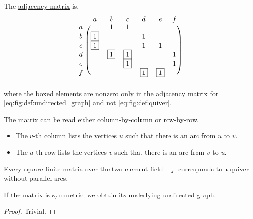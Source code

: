 \begin{example}
  The \hyperref[def:graph_adjacency_matrix]{adjacency matrix} is,
  \begin{equation}\label{ex:quiver_matrices/adjacency}
    \begin{blockarray}{cccccccc}
        & a        & b        & c        & d        & e        & f \\
    \begin{block}{c(ccccccc)}
      a &          & 1        & 1        &          &          &   \\
      b & \fbox{1} &          &          & 1        &          &   \\
      c & \fbox{1} &          &          & 1        & 1        &   \\
      d &          & \fbox{1} & \fbox{1} &          &          & 1 \\
      e &          &          & \fbox{1} &          &          & 1 \\
      f &          &          &          & \fbox{1} & \fbox{1} &   \\
    \end{block}
    \end{blockarray}
  \end{equation}
  where the boxed elements are nonzero only in the adjacency matrix for \eqref{eq:fig:def:undirected_graph} and not \eqref{eq:fig:def:quiver}.

  The matrix can be read either column-by-column or row-by-row.
  \begin{itemize}
    \item The \( v \)-th column lists the vertices \( u \) such that there is an arc from \( u \) to \( v \).
    \item The \( u \)-th row lists the vertices \( v \) such that there is an arc from \( v \) to \( u \).
  \end{itemize}
\end{example}

\begin{proposition}\label{thm:graph_undirected_iff_adjacency_matrix_is_symmetric}
  Every square finite matrix over the \hyperref[thm:f2_is_boolean_algebra]{two-element field} \( \BbbF_2 \) corresponds to a \hyperref[def:quiver]{quiver} without parallel arcs.

  If the matrix is symmetric, we obtain its underlying \hyperref[def:undirected_graph]{undirected graph}.
\end{proposition}
\begin{proof}
  Trivial.
\end{proof}

